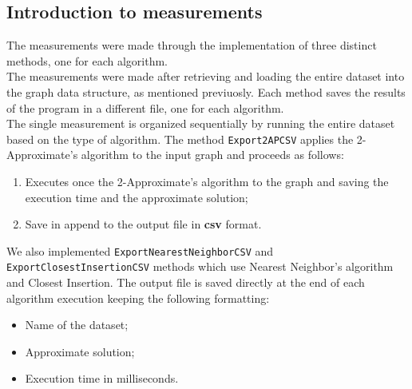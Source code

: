 \subsection{Introduction to measurements}
The measurements were made through the implementation of three distinct methods, one for each algorithm. \\ \noindent
The measurements were made after retrieving and loading the entire dataset into the graph data structure, as mentioned 
previuosly. Each method saves the results of the program in a different file, one for each algorithm.\\
\noindent
The single measurement is organized sequentially by running the entire dataset based on the type of algorithm. 
The method \verb|Export2APCSV| applies the 2-Approximate's algorithm to the input graph and proceeds as follows:
\begin{enumerate}
    \item Executes once the 2-Approximate's algorithm to the graph and saving the execution time and the approximate solution;
    \item Save in append to the output file in \textbf{csv} format. 
\end{enumerate}
We also implemented \verb|ExportNearestNeighborCSV| and \verb|ExportClosestInsertionCSV| methods which use Nearest Neighbor's algorithm and Closest Insertion.
\noindent
The output file is saved directly at the end of each algorithm execution keeping the following formatting:
\begin{itemize}
    \item Name of the dataset;
    \item Approximate solution;
    \item Execution time in milliseconds.
\end{itemize}